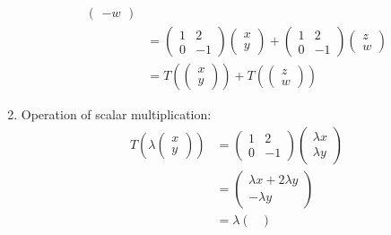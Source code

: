 \begin{exm}
\begin{flushleft}
\begin{enumerate}
\begin{align*}
\begin{pmatrix}
					      - w
				      \end{pmatrix}                                 \\
				       & = \begin{pmatrix}
					      1 & 2  \\
					      0 & -1
				      \end{pmatrix}\begin{pmatrix}
					      x \\ y
				      \end{pmatrix}+
				      \begin{pmatrix}
					      1 & 2  \\
					      0 & -1
				      \end{pmatrix}\begin{pmatrix}
					      z \\ w
				      \end{pmatrix}       \\
				       & = T\left(\begin{pmatrix}
					      x \\ y
				      \end{pmatrix}\right)+
				      T\left(\begin{pmatrix}
					      z \\ w
				      \end{pmatrix}\right)
			      \end{align*}
			\item Operation of scalar multiplication:
			      \begin{align*}
				      T\left(\lambda \begin{pmatrix}
					      x \\ y
				      \end{pmatrix}\right)
				       & =\begin{pmatrix}
					      1 & 2  \\
					      0 & -1
				      \end{pmatrix}\begin{pmatrix}
					      \lambda x \\ \lambda y
				      \end{pmatrix}  \\
				       & = \begin{pmatrix}
					      \lambda x + 2\lambda y \\
					      -\lambda y
				      \end{pmatrix}                           \\
				       & = \lambda \begin{pmatrix}

\end{pmatrix}
\end{align*}
\end{enumerate}
\end{flushleft}
\end{exm}
